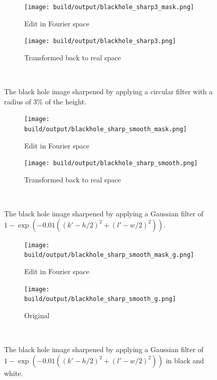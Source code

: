 \begin{figure}
    \centering
    \begin{subfigure}[h]{.49\linewidth}
        \centering
        \texttt{[image: build/output/blackhole\_sharp3\_mask.png]}
        \caption{Edit in Fourier space}
    \end{subfigure}
    \begin{subfigure}[h]{.49\linewidth}
        \centering
        \texttt{[image: build/output/blackhole\_sharp3.png]}
        \caption{Transformed back to real space}
    \end{subfigure}\
    \caption{The black hole image sharpened by applying a circular filter with a radius of 3\% of the height.}
    \label{fig:blackhole_sharp3}
\end{figure}
\begin{figure}
    \centering
    \begin{subfigure}[h]{.49\linewidth}
        \centering
        \texttt{[image: build/output/blackhole\_sharp\_smooth\_mask.png]}
        \caption{Edit in Fourier space}
    \end{subfigure}
    \begin{subfigure}[h]{.49\linewidth}
        \centering
        \texttt{[image: build/output/blackhole\_sharp\_smooth.png]}
        \caption{Transformed back to real space}
    \end{subfigure}\
    \caption{The black hole image sharpened by applying a Gaussian filter of $1-\exp(-0.01 ((k'-h/2)^2+(l'-w/2)^2))$.}
    \label{fig:blackhole_sharp_g}
\end{figure}
\begin{figure}
    \centering
    \begin{subfigure}[h]{.49\linewidth}
        \centering
        \texttt{[image: build/output/blackhole\_sharp\_smooth\_mask\_g.png]}
        \caption{Edit in Fourier space}
    \end{subfigure}
    \begin{subfigure}[h]{.49\linewidth}
        \centering
        \texttt{[image: build/output/blackhole\_sharp\_smooth\_g.png]}
        \caption{Original}
    \end{subfigure}\
    \caption{The black hole image sharpened by applying a Gaussian filter of $1-\exp(-0.01 ((k'-h/2)^2+(l'-w/2)^2))$ in black and white.}
    \label{fig:blackhole_sharp_g_g}
\end{figure}
